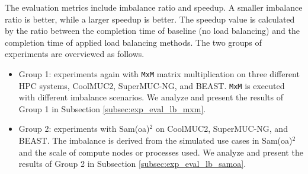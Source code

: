 \begin{table}[t]
\centering
\caption{The overview of different load balancing methods in comparison.}
{}
\label{tab:compare_methods}
\end{table}

The evaluation metrics include imbalance ratio and speedup. A smaller imbalance ratio is better, while a larger speedup is better. The speedup value is calculated by the ratio between the completion time of baseline (no load balancing) and the completion time of applied load balancing methods. The two groups of experiments are overviewed as follows.
\begin{itemize}
	\item Group 1: experiments again with \texttt{MxM} matrix multiplication on three different HPC systems, CoolMUC2, SuperMUC-NG, and BEAST. \texttt{MxM} is executed with different imbalance scenarios. We analyze and present the results of Group 1 in Subsection \ref{subsec:exp_eval_lb_mxm}.
	\item Group 2: experiments with Sam(oa)$^2$ on CoolMUC2, SuperMUC-NG, and BEAST. The imbalance is derived from the simulated use cases in Sam(oa)$^2$ and the scale of compute nodes or processes used. We analyze and present the results of Group 2 in Subsection \ref{subsec:exp_eval_lb_samoa}.
\end{itemize}

